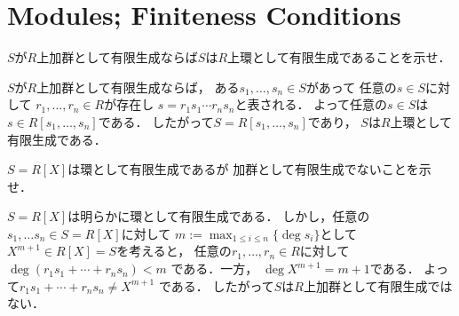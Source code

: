 \section{Modules; Finiteness Conditions}

\begin{prob}
  $S$が$R$上加群として有限生成ならば$S$は$R$上環として有限生成であることを示せ．
\end{prob}
\begin{ans}
  $S$が$R$上加群として有限生成ならば，
  ある$s_1, \dots , s_n \in S$があって
  任意の$s\in S$に対して
  $r_1, \dots, r_n \in R$が存在し
  $s = r_1 s_1 \cdots r_n s_n $と表される．
  よって任意の$s \in S$は
  $s \in R[s_1, \dots, s_n ]$である．
  したがって$S = R[s_1, \dots, s_n ]$であり，
  $S$は$R$上環として有限生成である．
\end{ans}

\begin{prob}
  $S = R[X]$は環として有限生成であるが
  加群として有限生成でないことを示せ．
\end{prob}
\begin{ans}
  $S = R[X]$は明らかに環として有限生成である．
  しかし，任意の$s_1, \dots s_n \in S = R[X]$に対して
  $ m := \max_{1 \le i \le n} \{ \deg s_i \} $として
  $X^{m+1} \in R[X] = S $を考えると，
  任意の$r_1, \dots , r_n \in R$に対して
  $ \deg ( r_1 s_1 + \cdots + r_n s_n ) < m $
  である．一方，
  $ \deg X^{m+1} = m + 1 $である．
  よって$ r_1 s_1 + \cdots + r_n s_n \ne X^{m+1} $
  である．
  したがって$S$は$R$上加群として有限生成ではない．
\end{ans}
